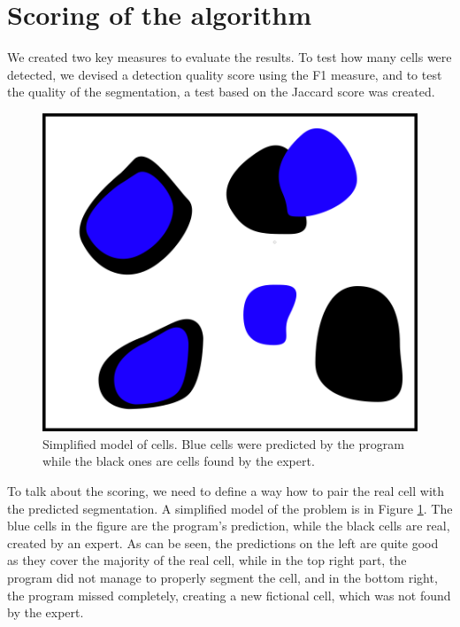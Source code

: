 \documentclass[
  digital,     %
  oneside,     %
  nosansbold,  %
  nocolorbold, %
  lof,         %
  lot,         %
]{fithesis4}
\begin{document}
\section{Scoring of the algorithm}

We created two key measures to evaluate the results. To test how many cells were
detected, we devised a detection quality score using the F1 measure, and to test the
quality of the segmentation, a test based on the Jaccard score was created.
\begin{figure}
    \begin{center}
        \includegraphics{resources/inkscape/evaluation.png}
    \end{center}
    \caption{Simplified model of cells. Blue cells were predicted by the program
    while the black ones are cells found by the expert.}
    \label{fig:evaluation_basic}
\end{figure}
To talk about the scoring, we need to define a way how to pair the real cell
with the predicted segmentation. A simplified model of the problem is in Figure
\ref{fig:evaluation_basic}. The blue cells in the figure are the program's
prediction, while the black cells are real, created by an expert. As can be seen,
the predictions on the left are quite good as they cover the majority of the real
cell, while in the top right part, the program did not manage to properly
segment the cell, and in the bottom right, the program missed completely,
creating a new fictional cell, which was not found by the expert.
\end{document}

